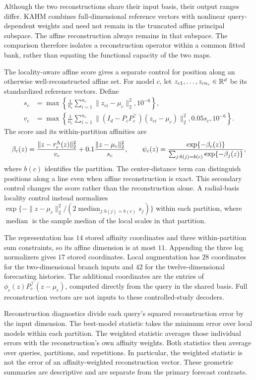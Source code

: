 Although the two reconstructions share their input basis, their output
ranges differ. KAHM combines full-dimensional reference vectors with
nonlinear query-dependent weights and need not remain in the truncated
affine principal subspace. The affine reconstruction always remains in
that subspace. The comparison therefore isolates a reconstruction
operator within a common fitted bank, rather than equating the functional
capacity of the two maps.

The locality-aware affine score gives a separate control for position
along an otherwise well-reconstructed affine set. For model $c$, let
$z_{c1},\ldots,z_{cn_c}\in\mathbb{R}^d$ be its standardized reference vectors.
Define
\begin{align*}
 s_c&=\max\left\{\frac1{n_c}\sum_{i=1}^{n_c}
       \|z_{ci}-\mu_c\|_2^2,10^{-6}\right\},\\
 v_c&=\max\left\{\frac1{n_c}\sum_{i=1}^{n_c}
       \|(I_d-P_cP_c^\top)(z_{ci}-\mu_c)\|_2^2,
       0.05s_c,10^{-6}\right\}.
\end{align*}
The score and its within-partition affinities are
\[
 \beta_c(z)=\frac{\|z-r_c^{\mathrm{A}}(z)\|_2^2}{v_c}
             +0.1\frac{\|z-\mu_c\|_2^2}{s_c},\qquad
 \psi_c(z)=\frac{\exp\{-\beta_c(z)\}}
 {\sum_{j:b(j)=b(c)}\exp\{-\beta_j(z)\}},
\]
where $b(c)$ identifies the partition. The center-distance term can
distinguish positions along a line even when affine reconstruction is
exact. This secondary control changes the score rather than the
reconstruction alone. A radial-basis locality control instead normalizes
$\exp\{-\|z-\mu_c\|_2^2/(2\operatorname{median}_{j:b(j)=b(c)}s_j)\}$
within each partition, where $\operatorname{median}$ is the sample median
of the local scales in that partition.

The representation has $14$ stored affinity coordinates and three
within-partition sum constraints, so its affine dimension is at most
$11$. Appending the three log normalizers gives $17$ stored coordinates.
Local augmentation has $28$ coordinates for the two-dimensional branch
inputs and $42$ for the twelve-dimensional forecasting histories.
The additional coordinates are the entries of
$\phi_c(z)P_c^\top(z-\mu_c)$, computed directly from the query in the
shared basis. Full reconstruction vectors are not inputs to these
controlled-study decoders.

Reconstruction diagnostics divide each query's squared reconstruction
error by the input dimension. The best-model statistic takes the minimum
error over local models within each partition. The weighted statistic
averages those individual errors with the reconstruction's own affinity
weights. Both statistics then average over queries, partitions, and
repetitions. In particular, the weighted statistic is not the error of
an affinity-weighted reconstruction vector. These geometric summaries
are descriptive and are separate from the primary forecast contrasts.

